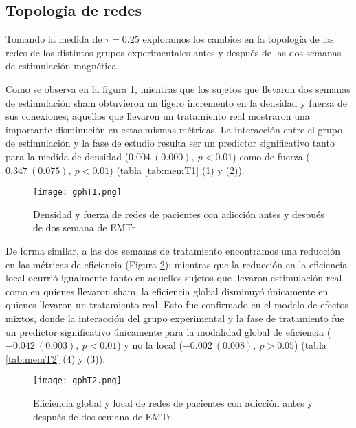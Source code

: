 \subsection{Topología de redes}
Tomando la medida de $\tau = 0.25$ exploramos los cambios en la topología de las redes de los distintos grupos experimentales antes y después de las dos semanas de estimulación magnética.\par
Como se observa en la figura \ref{fig:gpT1}, mientras que los sujetos que llevaron dos semanas de estimulación sham obtuvieron un ligero incremento en la densidad y fuerza de sus conexiones; aquellos que llevaron un tratamiento real mostraron una importante disminución en estas mismas métricas. La interacción entre el grupo de estimulación y la fase de estudio resulta ser un predictor significativo tanto para la medida de densidad ($0.004\ (0.000),\ p<0.01$) como de fuerza ($0.347\ (0.075),\ p<0.01$) (tabla \ref{tab:memT1} (1) y (2)).\par

\begin{figure}[!tb]
    \centering
    \texttt{[image: gphT1.png]}
    \caption{Densidad y fuerza de redes de pacientes con adicción antes y después de dos semana de EMTr}
    \label{fig:gpT1}
\end{figure}

De forma similar, a las dos semanas de tratamiento encontramos una reducción en las métricas de eficiencia (Figura \ref{fig:gpT2}); mientras que la reducción en la eficiencia local ocurrió igualmente tanto en aquellos sujetos que llevaron estimulación real como en quienes llevaron sham, la eficiencia global disminuyó únicamente en quienes llevaron un tratamiento real. Esto fue confirmado en el modelo de efectos mixtos, donde la interacción del grupo experimental y la fase de tratamiento fue un predictor significativo únicamente para la modalidad global de eficiencia ($-0.042\ (0.003),\ p<0.01$) y no la local ($-0.002\ (0.008),\ p>0.05$) (tabla \ref{tab:memT2} (4) y (3)).\par

\begin{figure}[!htb]
    \centering
    \texttt{[image: gphT2.png]}
    \caption{Eficiencia global y local de redes de pacientes con adicción antes y después de dos semana de EMTr}
    \label{fig:gpT2}
\end{figure}

